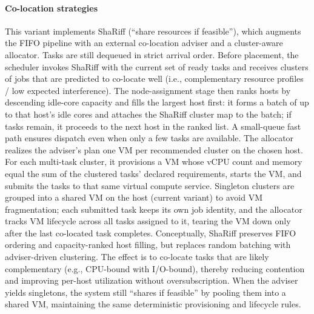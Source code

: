 \paragraph{Co-location strategies}
\label{sec:co-location_strategies}
This variant implements ShaRiff (“share resources if feasible”), which augments the FIFO pipeline with an external co-location adviser and a cluster-aware allocator. Tasks are still dequeued in strict arrival order. Before placement, the scheduler invokes ShaRiff with the current set of ready tasks and receives clusters of jobs that are predicted to co-locate well (i.e., complementary resource profiles / low expected interference). The node-assignment stage then ranks hosts by descending idle-core capacity and fills the largest host first: it forms a batch of up to that host’s idle cores and attaches the ShaRiff cluster map to the batch; if tasks remain, it proceeds to the next host in the ranked list. A small-queue fast path ensures dispatch even when only a few tasks are available.
The allocator realizes the adviser’s plan one VM per recommended cluster on the chosen host. For each multi-task cluster, it provisions a VM whose vCPU count and memory equal the sum of the clustered tasks’ declared requirements, starts the VM, and submits the tasks to that same virtual compute service. Singleton clusters are grouped into a shared VM on the host (current variant) to avoid VM fragmentation; each submitted task keeps its own job identity, and the allocator tracks VM lifecycle across all tasks assigned to it, tearing the VM down only after the last co-located task completes.
Conceptually, ShaRiff preserves FIFO ordering and capacity-ranked host filling, but replaces random batching with adviser-driven clustering. The effect is to co-locate tasks that are likely complementary (e.g., CPU-bound with I/O-bound), thereby reducing contention and improving per-host utilization without oversubscription. When the adviser yields singletons, the system still “shares if feasible” by pooling them into a shared VM, maintaining the same deterministic provisioning and lifecycle rules.

